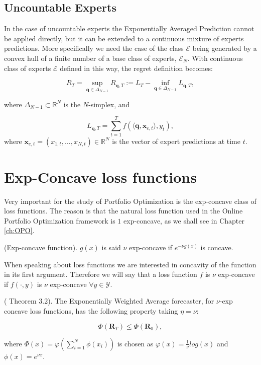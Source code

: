 \subsection{Uncountable Experts}\label{sec:uncountable_exp}

In the case of uncountable experts the Exponentially Averaged Prediction cannot be applied directly, but it can be extended to a continuous mixture of experts predictions. More specifically we need the case of the class $\mathcal E$ being generated by a convex hull of a finite number of a base class of experts, $\mathcal E_N$.
With continuous class of experts $\mathcal E$ defined in this way, the regret definition becomes:

\begin{equation}
    R_T = \sup\limits_{\mathbf q\in\Delta_{N-1}}R_{\mathbf q,T}:=L_T-\inf\limits_{\mathbf q\in\Delta_{N-1}}L_{\mathbf q,T},
\end{equation}

where $\Delta_{N-1}\subset \mathbb R^{N}$ is the $N$-simplex, and 

$$L_{\mathbf q,T}=\sum\limits_{t=1}^T f(\langle \mathbf q,\mathbf x_{e,t}\rangle,y_t),$$
where $\mathbf x_{e,t}=(x_{1,t},\ldots,x_{N,t})\in\mathbb R^N$ is the vector of expert predictions at time $t$.


\section{Exp-Concave loss functions}\label{sec:exp-concave-mixture}

Very important for the study of Portfolio Optimization is the exp-concave class of loss functions. The reason is that the natural loss function used in the Online Portfolio Optimization framework is $1$ exp-concave, as we shall see in Chapter \ref{ch:OPO}.

\begin{definition}(Exp-concave function). 
$g(x)$ is said $\nu$ exp-concave if $e^{-\nu g(x)}$ is concave.
\end{definition}

When speaking about loss functions we are interested in concavity of the function in its first argument. Therefore we will say that a loss function $f$ is $\nu$ exp-concave if $f(\cdot,y)$ is $\nu$ exp-concave $\forall y\in\mathcal Y$. 

\begin{theorem}\label{th:General_Blk}(\cite{cesa2006prediction} Theorem 3.2).
The Exponentially Weighted Average forecaster, for $\nu$-exp concave loss functions, has the following property taking $\eta=\nu$:

$$\Phi(\mathbf R_T)\le \Phi(\mathbf R_0),$$

where $\Phi(x)=\varphi\left(\sum\limits_{i=1}^N\phi(x_i)\right)$ is chosen as $\varphi(x)=\frac{1}{\nu}log(x)$ and $\phi(x)=e^{\nu x}.$

\end{theorem}

